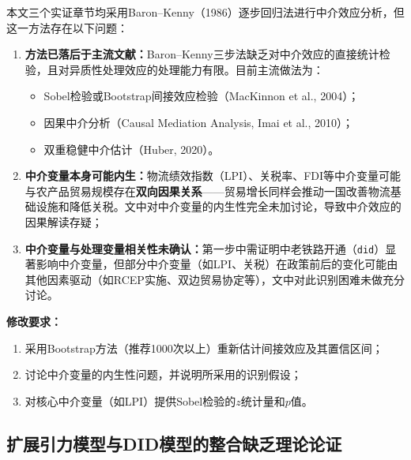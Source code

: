 \documentclass[12pt, a4paper]{article}
\begin{document}
\begin{majorbox}

本文三个实证章节均采用Baron--Kenny（1986）逐步回归法进行中介效应分析，但这一方法存在以下问题：

\begin{enumerate}[label=\arabic*)]
  \item \textbf{方法已落后于主流文献：}Baron--Kenny三步法缺乏对中介效应的直接统计检验，且对异质性处理效应的处理能力有限。目前主流做法为：
    \begin{itemize}
      \item Sobel检验或Bootstrap间接效应检验（MacKinnon et al., 2004）；
      \item 因果中介分析（Causal Mediation Analysis, Imai et al., 2010）；
      \item 双重稳健中介估计（Huber, 2020）。
    \end{itemize}
  \item \textbf{中介变量本身可能内生：}物流绩效指数（LPI）、关税率、FDI等中介变量可能与农产品贸易规模存在\textbf{双向因果关系}——贸易增长同样会推动一国改善物流基础设施和降低关税。文中对中介变量的内生性完全未加讨论，导致中介效应的因果解读存疑；

  \item \textbf{中介变量与处理变量相关性未确认：}第一步中需证明中老铁路开通（\texttt{did}）显著影响中介变量，但部分中介变量（如LPI、关税）在政策前后的变化可能由其他因素驱动（如RCEP实施、双边贸易协定等），文中对此识别困难未做充分讨论。
\end{enumerate}

\textbf{修改要求：}
\begin{enumerate}[label=(\alph*)]
  \item 采用Bootstrap方法（推荐1000次以上）重新估计间接效应及其置信区间；
  \item 讨论中介变量的内生性问题，并说明所采用的识别假设；
  \item 对核心中介变量（如LPI）提供Sobel检验的$z$统计量和$p$值。
\end{enumerate}
\end{majorbox}

\subsection{扩展引力模型与DID模型的整合缺乏理论论证}
\label{sec:gravity_did}
\end{document}
